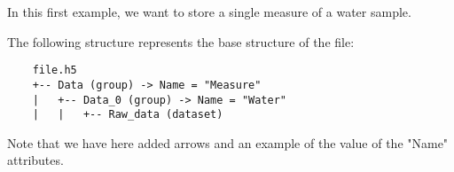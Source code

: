 In this first example, we want to store a single measure of a water sample.
    
The following structure represents the base structure of the file:
\begin{verbatim}
    file.h5
    +-- Data (group) -> Name = "Measure"
    |   +-- Data_0 (group) -> Name = "Water"
    |   |   +-- Raw_data (dataset)
\end{verbatim}
Note that we have here added arrows and an example of the value of the "Name" attributes.